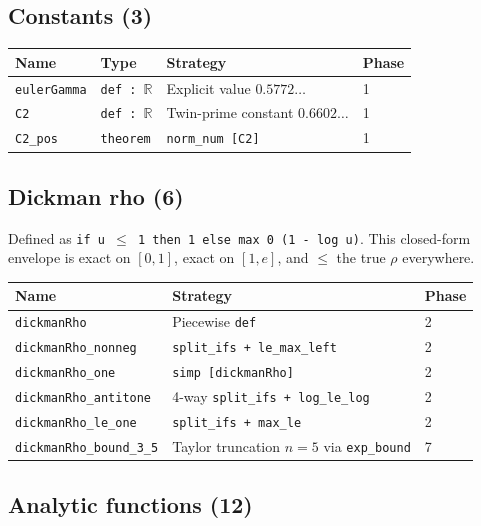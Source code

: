 \documentclass[11pt,a4paper]{article}
\begin{document}
\subsection{Constants (3)}

\begin{center}
\begin{tabular}{@{}llll@{}}
\toprule
Name & Type & Strategy & Phase \\
\midrule
\texttt{eulerGamma} & \texttt{def : $\mathbb{R}$} & Explicit value $0.5772\ldots$ & 1 \\
\texttt{C2} & \texttt{def : $\mathbb{R}$} & Twin-prime constant $0.6602\ldots$ & 1 \\
\texttt{C2\_pos} & \texttt{theorem} & \texttt{norm\_num [C2]} & 1 \\
\bottomrule
\end{tabular}
\end{center}

\subsection{Dickman rho (6)}

Defined as \texttt{if u $\le$ 1 then 1 else max 0 (1 - log u)}.  This closed-form envelope is exact on $[0,1]$, exact on $[1,e]$, and $\le$ the true $\rho$ everywhere.

\begin{center}
\begin{tabular}{@{}lll@{}}
\toprule
Name & Strategy & Phase \\
\midrule
\texttt{dickmanRho} & Piecewise \texttt{def} & 2 \\
\texttt{dickmanRho\_nonneg} & \texttt{split\_ifs + le\_max\_left} & 2 \\
\texttt{dickmanRho\_one} & \texttt{simp [dickmanRho]} & 2 \\
\texttt{dickmanRho\_antitone} & 4-way \texttt{split\_ifs + log\_le\_log} & 2 \\
\texttt{dickmanRho\_le\_one} & \texttt{split\_ifs + max\_le} & 2 \\
\texttt{dickmanRho\_bound\_3\_5} & Taylor truncation $n\!=\!5$ via \texttt{exp\_bound} & 7 \\
\bottomrule
\end{tabular}
\end{center}

\subsection{Analytic functions (12)}
\end{document}
